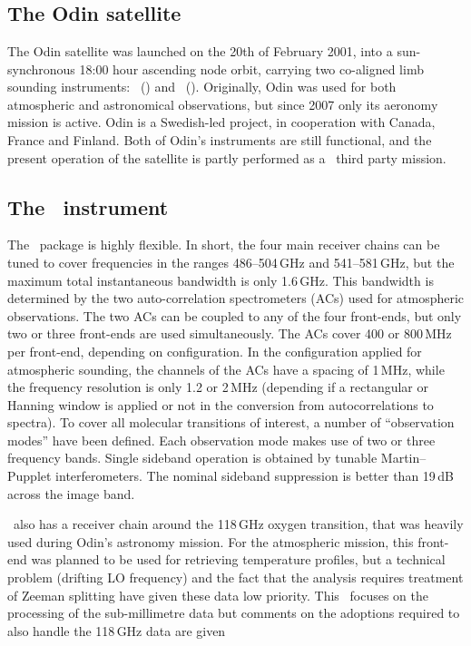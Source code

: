 \section{\smr}
\label{sec:smr}
%
\subsection{The Odin satellite}
\label{sec:odin}
%
The Odin satellite was launched on the 20th of February 2001, into a sun-synchronous
18:00 hour ascending node orbit, carrying two co-aligned limb sounding
instruments: \OSIRIS\ (\OSIRISlong) and
\SMR\ (\SMRlong). Originally, Odin was used for both
atmospheric and astronomical observations, but since 2007 only its aeronomy
mission is active. Odin is a Swedish-led project, in cooperation with Canada,
France and Finland. Both of Odin's instruments are still functional, and the
present operation of the satellite is partly performed as a \ESA\ third party
mission.


\subsection{The \SMR\ instrument}
\label{sec:smr:details}
%
The \smr\ package is highly flexible. In short, the four main receiver chains
can be tuned to cover frequencies in the ranges 486--504\,GHz and
541--581\,GHz, but the maximum total instantaneous bandwidth is only 1.6\,GHz.
This bandwidth is determined by the two auto-correlation spectrometers (ACs)
used for atmospheric observations. The two ACs can be coupled to any of the
four front-ends, but only two or three front-ends are used simultaneously. The
ACs cover 400 or 800\,MHz per front-end, depending on configuration. In the
configuration applied for atmospheric sounding, the channels of the ACs have a
spacing of 1\,MHz, while the frequency resolution is only 1.2 or 2\,MHz
(depending if a rectangular or Hanning window is applied or not in the
conversion from autocorrelations to spectra). To cover all molecular
transitions of interest, a number of ``observation modes'' have been defined.
Each observation mode makes use of two or three frequency bands. Single
sideband operation is obtained by tunable Martin--Pupplet interferometers. The
nominal sideband suppression is better than 19\,dB across the image band.

\smr\ also has a receiver chain around the 118\,GHz oxygen transition, that was
heavily used during Odin's astronomy mission. For the atmospheric mission, this
front-end was planned to be used for retrieving temperature profiles, but a
technical problem (drifting LO frequency) and the fact that the analysis
requires treatment of Zeeman splitting have given these data low priority. This
\ATBD\ focuses on the processing of the sub-millimetre data but comments on the
adoptions required to also handle the 118\,GHz data are given

